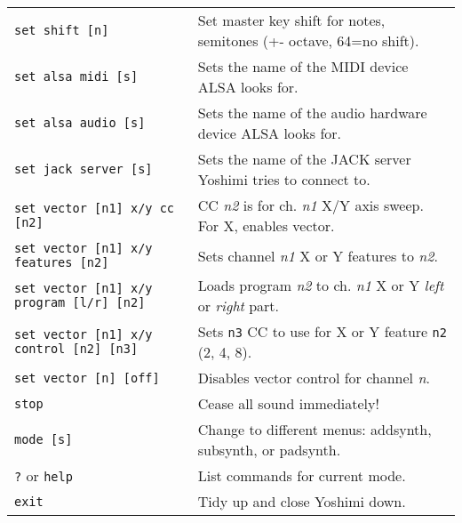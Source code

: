 \begin{table}[H]
\begin{tabular}{l l}
         \texttt{set shift [n]} &
            Set master key shift for notes, semitones (+- octave,
            64=no shift). \\

         \texttt{set alsa midi [s]} &
            Sets the name of the MIDI device ALSA looks for. \\

         \texttt{set alsa audio [s]} &
            Sets the name of the audio hardware device ALSA looks for. \\

         \texttt{set jack server [s]} &
            Sets the name of the JACK server Yoshimi tries to connect to. \\

         \texttt{set vector [n1] x/y cc [n2]} &
            CC \textsl{n2} is for ch. \textsl{n1} X/Y axis sweep.
            For X, enables vector. \\

         \texttt{set vector [n1] x/y features [n2]} &
            Sets channel \textsl{n1} X or Y features to \textsl{n2}. \\

         \texttt{set vector [n1] x/y program [l/r] [n2]} &
            Loads program \textsl{n2} to ch. \textsl{n1} X or Y
            \textsl{left} or \textsl{right} part. \\

         \texttt{set vector [n1] x/y control [n2] [n3]} &
            Sets \texttt{n3} CC to use for X or Y feature \texttt{n2}
            (2, 4, 8). \\

         \texttt{set vector [n] [off]} &
            Disables vector control for channel \textsl{n}. \\

         \texttt{stop} &
            Cease all sound immediately! \\

         \texttt{mode [s]} &
            Change to different menus: addsynth, subsynth, or padsynth. \\

         \texttt{?} or \texttt{help} &
            List commands for current mode. \\

         \texttt{exit} &
            Tidy up and close Yoshimi down. \\

      \end{tabular}
   \end{table}


